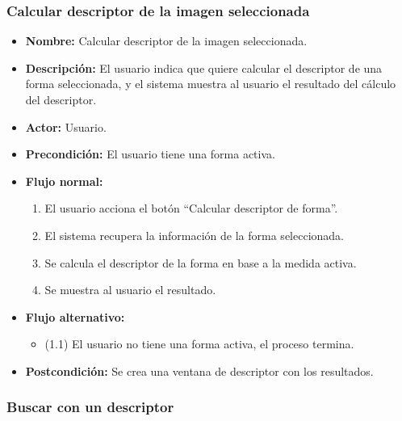 \subsubsection{Calcular descriptor de la imagen seleccionada}

\begin{itemize}
\item \textbf{Nombre: }Calcular descriptor de la imagen seleccionada.
\item \textbf{Descripción: }El usuario indica que quiere calcular el descriptor de una forma seleccionada, y el sistema muestra al usuario el resultado del cálculo del descriptor.
\item \textbf{Actor: }Usuario.
\item \textbf{Precondición: }El usuario tiene una forma activa.
\item \textbf{Flujo normal: }
\begin{enumerate}
\item El usuario acciona el botón ``Calcular descriptor de forma''.
\item El sistema recupera la información de la forma seleccionada.
\item Se calcula el descriptor de la forma en base a la medida activa.
\item Se muestra al usuario el resultado.
\end{enumerate}
\item \textbf{Flujo alternativo:}
\begin{itemize}
\item (1.1) El usuario no tiene una forma activa, el proceso termina.
\end{itemize}
\item \textbf{Postcondición: }Se crea una ventana de descriptor con los resultados.
\end{itemize}

\subsubsection{Buscar con un descriptor}

